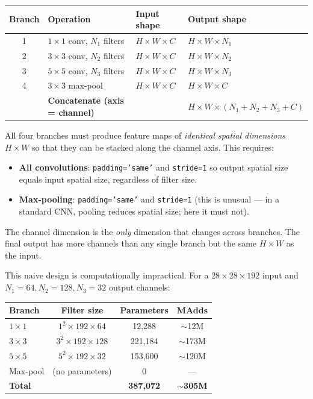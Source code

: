 \documentclass[11pt,a4paper]{article}
\begin{document}
\begin{center}
\renewcommand{\arraystretch}{1.3}
\begin{tabular}{@{}clll@{}}
\toprule
\textbf{Branch} & \textbf{Operation} & \textbf{Input shape} & \textbf{Output shape} \\
\midrule
1 & $1\times1$ conv, $N_1$ filters  & $H\times W\times C$ & $H\times W\times N_1$ \\
2 & $3\times3$ conv, $N_2$ filters  & $H\times W\times C$ & $H\times W\times N_2$ \\
3 & $5\times5$ conv, $N_3$ filters  & $H\times W\times C$ & $H\times W\times N_3$ \\
4 & $3\times3$ max-pool             & $H\times W\times C$ & $H\times W\times C$   \\
\midrule
  & \textbf{Concatenate (axis = channel)} & & $H\times W\times(N_1+N_2+N_3+C)$ \\
\bottomrule
\end{tabular}
\end{center}

\begin{insightbox}[Why concatenation requires \texttt{padding='same'} and stride 1]
All four branches must produce feature maps of \emph{identical spatial dimensions} $H\times W$
so that they can be stacked along the channel axis.  This requires:
\begin{itemize}
  \item \textbf{All convolutions}: \texttt{padding='same'} and \texttt{stride=1} so output
    spatial size equals input spatial size, regardless of filter size.
  \item \textbf{Max-pooling}: \texttt{padding='same'} and \texttt{stride=1} (this is unusual —
    in a standard CNN, pooling reduces spatial size; here it must not).
\end{itemize}
The channel dimension is the \emph{only} dimension that changes across branches.  The final
output has more channels than any single branch but the same $H\times W$ as the input.
\end{insightbox}

This naive design is computationally impractical.  For a $28\times28\times192$ input and
$N_1{=}64, N_2{=}128, N_3{=}32$ output channels:

\begin{center}
\renewcommand{\arraystretch}{1.25}
\begin{tabular}{@{}lccc@{}}
\toprule
\textbf{Branch} & \textbf{Filter size} & \textbf{Parameters} & \textbf{MAdds} \\
\midrule
$1\times1$ & $1^2\times192\times64$   & 12{,}288   & $\sim$12M \\
$3\times3$ & $3^2\times192\times128$  & 221{,}184  & $\sim$173M \\
$5\times5$ & $5^2\times192\times32$   & 153{,}600  & $\sim$120M \\
Max-pool   & (no parameters)          & 0          & —         \\
\midrule
\textbf{Total} & & \textbf{387{,}072} & $\boldsymbol{\sim}$\textbf{305M} \\
\bottomrule
\end{tabular}
\end{center}
\end{document}
